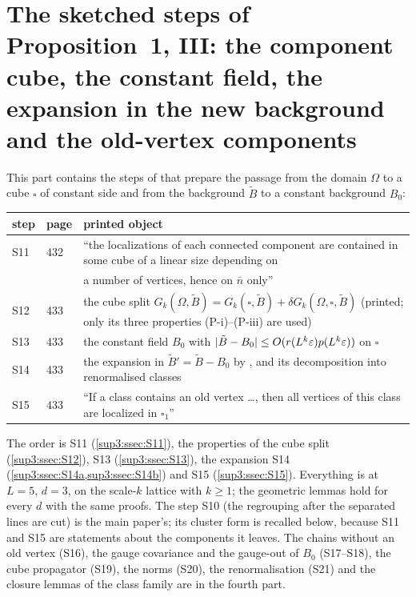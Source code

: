 
\section{The sketched steps of Proposition~1, III: the component cube, the constant field, the expansion in the new background and the old-vertex components}\label{sup3:sec}

This part contains the steps of \cite[pp.~432--433]{Ba3} that prepare the passage from the domain $\Omega$ to a cube $\square$ of constant side and from the background $\tilde B$ to a constant background $B_0$:

\begin{center}
\begin{tabular}{lll}
step & \cite{Ba3} page & printed object\\\hline
S11 & 432 & ``the localizations of each connected component are contained in some cube of a linear size depending on\\
 & & a number of vertices, hence on $\bar n$ only''\\
S12 & 433 & the cube split $G_k(\Omega,\tilde B)=G_k(\square,\tilde B)+\delta G_k(\Omega,\square,\tilde B)$ (printed; only its three properties (P-i)--(P-iii) are used)\\
S13 & 433 & the constant field $B_0$ with $|\tilde B-B_0|\le O(r(L^k\varepsilon)p(L^k\varepsilon))$ on $\square$\\
S14 & 433 & the expansion in $\tilde B'=\tilde B-B_0$ by \cite[(3.14), (3.44), (3.45)]{Ba1}, and its decomposition into renormalised classes\\
S15 & 433 & ``If a class contains an old vertex \dots, then all vertices of this class are localized in $\square_1$''
\end{tabular}
\end{center}

The order is S11 (\cref{sup3:ssec:S11}), the properties of the cube split (\cref{sup3:ssec:S12}), S13 (\cref{sup3:ssec:S13}), the expansion S14 (\cref{sup3:ssec:S14a,sup3:ssec:S14b}) and S15 (\cref{sup3:ssec:S15}). Everything is at $L=5$, $d=3$, on the scale-$k$ lattice with $k\ge1$; the geometric lemmas hold for every $d$ with the same proofs. The step S10 (the regrouping after the separated lines are cut) is the main paper's; its cluster form is recalled below, because S11 and S15 are statements about the components it leaves. The chains without an old vertex (S16), the gauge covariance and the gauge-out of $B_0$ (S17--S18), the cube propagator (S19), the norms (S20), the renormalisation (S21) and the closure lemmas of the class family are in the fourth part.


